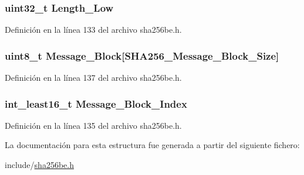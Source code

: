 \hypertarget{struct_s_h_a256_context_a188eef03938236a9a58c9382166aa002}{}
\subsubsection[{Length\+\_\+\+Low}]{\setlength{\rightskip}{0pt plus 5cm}uint32\+\_\+t Length\+\_\+\+Low}\label{struct_s_h_a256_context_a188eef03938236a9a58c9382166aa002}


Definición en la línea 133 del archivo sha256be.\+h.

\hypertarget{struct_s_h_a256_context_a84b3f788f46b63afe4b879ed78e73051}{}
\subsubsection[{Message\+\_\+\+Block}]{\setlength{\rightskip}{0pt plus 5cm}uint8\+\_\+t Message\+\_\+\+Block\mbox{[}{\bf S\+H\+A256\+\_\+\+Message\+\_\+\+Block\+\_\+\+Size}\mbox{]}}\label{struct_s_h_a256_context_a84b3f788f46b63afe4b879ed78e73051}


Definición en la línea 137 del archivo sha256be.\+h.

\hypertarget{struct_s_h_a256_context_ad7bf01bcc0244679564a37f2c25ffc8c}{}
\subsubsection[{Message\+\_\+\+Block\+\_\+\+Index}]{\setlength{\rightskip}{0pt plus 5cm}int\+\_\+least16\+\_\+t Message\+\_\+\+Block\+\_\+\+Index}\label{struct_s_h_a256_context_ad7bf01bcc0244679564a37f2c25ffc8c}


Definición en la línea 135 del archivo sha256be.\+h.



La documentación para esta estructura fue generada a partir del siguiente fichero\+:\begin{DoxyCompactItemize}
\item 
include/\hyperlink{sha256be_8h}{sha256be.\+h}\end{DoxyCompactItemize}
